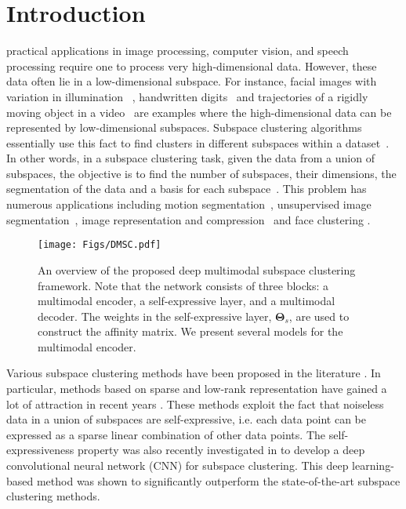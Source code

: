\documentclass[journal]{IEEEtran}
\begin{document}
\IEEEpeerreviewmaketitle

\section{Introduction}\label{sec:intro}

 practical applications in image processing, computer vision, and speech processing require one to process very high-dimensional data.  However, these data often lie in a low-dimensional subspace.  For instance,  facial images with variation in illumination ~\cite{BasriJacobs},  handwritten digits~\cite{digitsDim} and trajectories of a rigidly moving object in a video~\cite{KanadeMotionSeg} are examples where the high-dimensional data can be represented by low-dimensional  subspaces.  Subspace clustering algorithms essentially use this fact to find clusters in different subspaces within a dataset~\cite{SC_vidal}.   In other words, in a subspace clustering task, given the data from a union of subspaces, the objective is to find the number of subspaces, their dimensions, the segmentation of the data and a basis for each subspace~\cite{SC_vidal}.  This problem has numerous applications including motion segmentation~\cite{wu2001multibody}, unsupervised image segmentation~\cite{yang2008unsupervised}, image representation and compression~\cite{hong2006multiscale} and face clustering \cite{ho2003clustering}.

\begin{figure}[t]
	\texttt{[image: Figs/DMSC.pdf]}
	\caption{An overview of the proposed deep multimodal subspace clustering framework.	Note that the network consists of three blocks: a multimodal encoder, a self-expressive layer, and a multimodal decoder.	The weights in the self-expressive layer, $\boldsymbol{\Theta}_s$, are used to construct the affinity matrix. We present several models for the multimodal encoder.}	\label{fig:overvieww}
\end{figure}


Various subspace clustering methods have been proposed in the literature \cite{LLMC, LSA, SSC_CVPR, LRR, LRSC,li2015structured,you2016scalable,deepsc17nips,abavisani2018adversarial,abavisani2016domain,lu2012robust,ji2014efficient}.  In particular, methods based on sparse and low-rank representation have gained a lot of attraction in recent years \cite{SSC_PAMI, LRR_PAMI_2013,li2015structured,you2016scalable, latenst_SSC_LRR, Patel_KSSC_ICIP14, LRSSC_NIPS2013, zhang2015low}.   These methods exploit the fact that noiseless data in a union of subspaces are self-expressive, i.e. each data point can be expressed as a sparse linear combination of other data points.      The self-expressiveness property was also recently investigated in \cite{deepsc17nips} to develop a deep convolutional neural network (CNN) for subspace clustering.  This deep learning-based method was shown to significantly outperform the state-of-the-art subspace clustering methods.  
\end{document}
